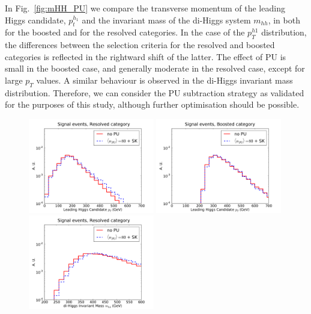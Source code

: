 In Fig.~\ref{fig:mHH_PU}
we compare the transverse momentum of the leading Higgs
candidate, $p_t^{h_1}$ and the invariant mass of the di-Higgs system
$m_{hh}$, in both for the boosted and
for the resolved categories.
%
In the case of the $p_T^{h1}$ distribution, the differences between the selection
criteria for the resolved
and boosted categories is reflected in the rightward shift of the latter.
%
The effect of PU is small in the boosted case, and generally moderate
in the resolved case, except for large $p_T$ values.
%
A similar behaviour is observed in the di-Higgs invariant mass distribution.
%
Therefore, we can consider the PU subtraction strategy
as validated for the purposes of this study, although
further optimisation should be possible.

\begin{figure}[t]
  \begin{center}
  \includegraphics[width=0.49\textwidth]{plots/pt_H0_C2_res_comp.pdf}
  \includegraphics[width=0.49\textwidth]{plots/pt_H0_C2_bst_comp.pdf}
  \includegraphics[width=0.49\textwidth]{plots/m_HH_C2_res_comp.pdf}

\end{center}
\end{figure}
